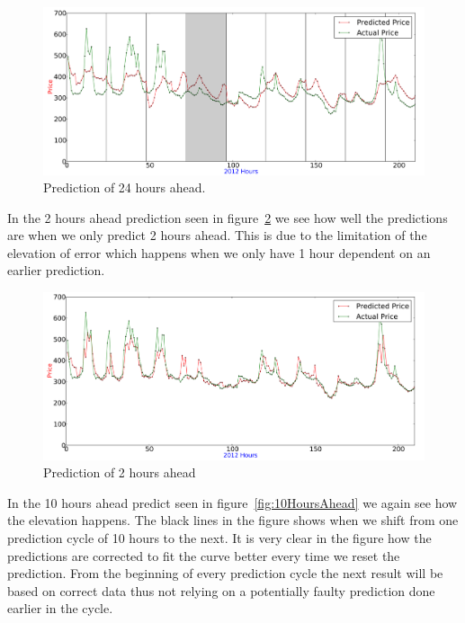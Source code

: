 \begin{figure}[H]
\centering
\includegraphics[width=\linewidth]{billeder/PriceExperimentalAnalysis/24HoursAhead_ElevationOfErrorExample.png}
\caption{Prediction of 24 hours ahead.}
\label{fig:24HoursAhead_elevationOfError}
\end{figure}

In the 2 hours ahead prediction seen in figure~\ref{fig:2HoursAhead} we see how well the predictions are when we only predict 2 hours ahead. This is due to the limitation of the elevation of error which happens when we only have 1 hour dependent on an earlier prediction.

\begin{figure}[H]
\centering
\includegraphics[width=\linewidth]{billeder/PriceExperimentalAnalysis/2HoursAheadForecast.png}
\caption{Prediction of 2 hours ahead}
\label{fig:2HoursAhead}
\end{figure}

In the 10 hours ahead predict seen in figure~\ref{fig:10HoursAhead} we again see how the elevation happens. The black lines in the figure shows when we shift from one prediction cycle of 10 hours to the next. It is very clear in the figure how the predictions are corrected to fit the curve better every time we reset the prediction. From the beginning of every prediction cycle the next result will be based on correct data thus not relying on a potentially faulty prediction done earlier in the cycle.

